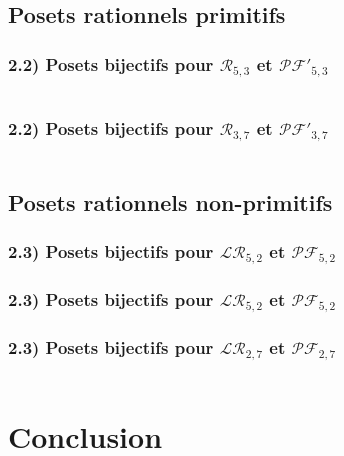 \documentclass{beamer}
\begin{document}
\subsection{Posets rationnels primitifs}

\begin{frame}
    \frametitle{2.2) Posets \textbf{bijectifs} pour $\mathcal{R}_{5,3}$ et
        $\mathcal{PF'}_{5,3}$}
        \begin{columns}
            \begin{column}{0.35\textwidth}
                
            \end{column}
            \begin{column}{0.65\textwidth}
                
            \end{column}
        \end{columns}
\end{frame}

\begin{frame}
    \frametitle{2.2) Posets \textbf{bijectifs} pour $\mathcal{R}_{3,7}$ et
        $\mathcal{PF'}_{3,7}$}
        \begin{columns}
            \begin{column}{0.5\textwidth}
                
            \end{column}
            \begin{column}{0.5\textwidth}
                
            \end{column}
        \end{columns}
\end{frame}

\subsection{Posets rationnels non-primitifs}

\begin{frame}
    \frametitle{2.3) Posets \textbf{bijectifs} pour $\mathcal{LR}_{5,2}$ et
        $\mathcal{PF}_{5,2}$}
        
\end{frame}

\begin{frame}
    \frametitle{2.3) Posets \textbf{bijectifs} pour $\mathcal{LR}_{5,2}$ et
        $\mathcal{PF}_{5,2}$}
        
\end{frame}

\begin{frame}
    \frametitle{2.3) Posets \textbf{bijectifs} pour $\mathcal{LR}_{2,7}$ et
        $\mathcal{PF}_{2,7}$}
        \begin{columns}
            \begin{column}{0.5\textwidth}
                
            \end{column}
            \begin{column}{0.5\textwidth}
                
            \end{column}
        \end{columns}
\end{frame}

\section{Conclusion}
\end{document}
